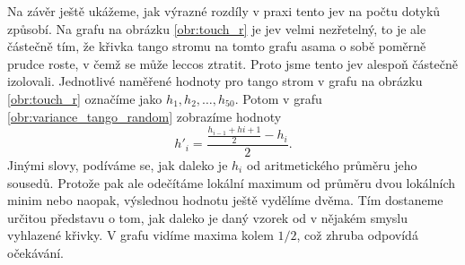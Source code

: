 Na závěr ještě ukážeme, jak výrazné rozdíly v praxi tento jev na počtu dotyků
způsobí. Na grafu na obrázku \ref{obr:touch_r} je jev velmi nezřetelný, to je ale
částečně tím, že křivka tango stromu na tomto grafu asama o sobě poměrně prudce
roste, v čemž se může leccos ztratit. Proto jsme tento jev alespoň částečně
izolovali. Jednotlivé naměřené hodnoty pro tango strom v grafu na obrázku
\ref{obr:touch_r} označíme jako $h_1, h_2, \dots, h_{50}$. Potom v grafu
\ref{obr:variance_tango_random} zobrazíme hodnoty $$h'_i =
\frac{\frac{h_{i-1}+h{i+1}}2-h_i}2.$$ Jinými slovy, podíváme se, jak daleko je
$h_i$ od aritmetického průměru jeho sousedů. Protože pak ale odečítáme lokální
maximum od průměru dvou lokálních minim nebo naopak, výslednou hodnotu ještě
vydělíme dvěma. Tím dostaneme určitou představu o tom, jak daleko je daný
vzorek od v nějakém smyslu vyhlazené křivky. V grafu vidíme maxima kolem $1/2$,
což zhruba odpovídá očekávání. 

